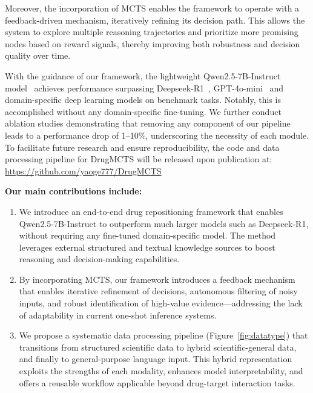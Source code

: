 \documentclass[letterpaper,twocolumn,10pt]{llncs}
\begin{document}
Moreover, the incorporation of MCTS enables the framework to operate with a feedback-driven mechanism, iteratively refining its decision path. This allows the system to explore multiple reasoning trajectories and prioritize more promising nodes based on reward signals, thereby improving both robustness and decision quality over time.

With the guidance of our framework, the lightweight Qwen2.5-7B-Instruct model~\cite{team2024qwen2} achieves performance surpassing Deepseek-R1~\cite{guo2025deepseek}, GPT-4o-mini~\cite{hurst2024gpt} and domain-specific deep learning models on benchmark tasks. Notably, this is accomplished without any domain-specific fine-tuning. We further conduct ablation studies demonstrating that removing any component of our pipeline leads to a performance drop of 1--10\%, underscoring the necessity of each module. To facilitate future research and ensure reproducibility, the code and data processing pipeline for DrugMCTS will be released upon publication at: \url{https://github.com/yaoge777/DrugMCTS}

\textbf{Our main contributions include:}

\begin{enumerate}[label=\alph*., leftmargin=*]
    \item We introduce an end-to-end drug repositioning framework that enables Qwen2.5-7B-Instruct to outperform much larger models such as Deepseek-R1, without requiring any fine-tuned domain-specific model. The method leverages external structured and textual knowledge sources to boost reasoning and decision-making capabilities.
    
    \item By incorporating MCTS, our framework introduces a feedback mechanism that enables iterative refinement of decisions, autonomous filtering of noisy inputs, and robust identification of high-value evidence—addressing the lack of adaptability in current one-shot inference systems.
    
    \item We propose a systematic data processing pipeline (Figure~\ref{fig:datatype}) that transitions from structured scientific data to hybrid scientific-general data, and finally to general-purpose language input. This hybrid representation exploits the strengths of each modality, enhances model interpretability, and offers a reusable workflow applicable beyond drug-target interaction tasks.
\end{enumerate}
\end{document}
